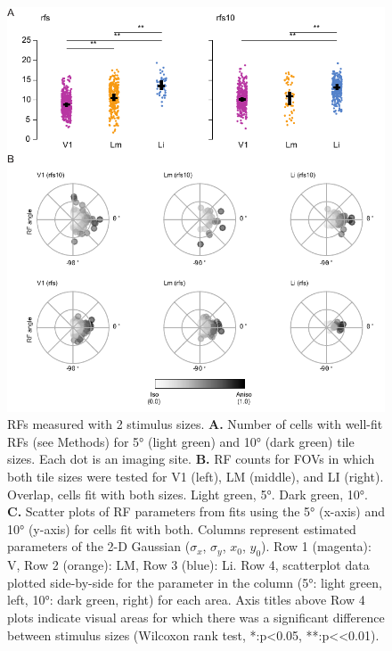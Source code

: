 \begin{figure}[tp!]
\includegraphics[width=\textwidth]{figures/supplemental/fig_s7_rf5_rf10_aggregate/fig_s7_rf5_rf10_aggregate.pdf}
    \caption[RF mapping stimuli]{RFs measured with 2 stimulus sizes.
    \textbf{A.} Number of cells with well-fit RFs (see Methods) for \ang{5} (light green) and \ang{10} (dark green) tile sizes. Each dot is an imaging site.
    \textbf{B.} RF counts for FOVs in which both tile sizes were tested for V1 (left), LM (middle), and LI (right). Overlap, cells fit with both sizes. Light green, \ang{5}. Dark green, \ang{10}.
    \textbf{C.} Scatter plots of RF parameters from fits using the \ang{5} (x-axis) and \ang{10} (y-axis) for cells fit with both. Columns represent estimated parameters of the 2-D Gaussian ($\sigma_x$, $\sigma_y$, $x_0$, $y_0$). Row 1 (magenta): V, Row 2 (orange): LM, Row 3 (blue): Li. Row 4, scatterplot data plotted side-by-side for the parameter in the column (\ang{5}: light green, left, \ang{10}: dark green, right) for each area. Axis titles above Row 4 plots indicate visual areas for which there was a significant difference between stimulus sizes (Wilcoxon rank test, *:p<0.05, **:p<<0.01).
    \label{supfig:rf5_rf10_aggregate}}
\end{figure}


